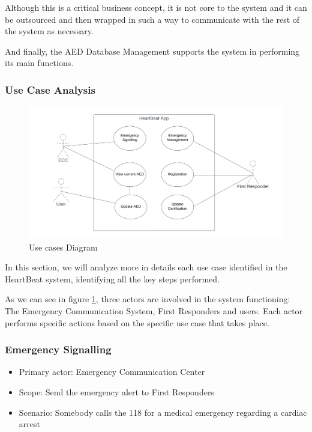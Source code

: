\documentclass[11pt,a4paper]{article}
\begin{document}
Although this is a critical business concept, it is not core to the system and it can be outsourced and then wrapped in such a way to communicate with the rest of the system as necessary.

And finally, the AED Database Management supports the system in performing its main functions.

\subsubsection{Use Case Analysis}

\begin{figure}
    \centering
    \includegraphics[scale=0.7, width=\textwidth]{images/use-case.png}
    \caption{Use cases Diagram}
    \label{fig:uml-emergency}
\end{figure}

In this section, we will analyze more in details each use case identified in the HeartBeat system, identifying all the key steps performed.

As we can see in figure \ref{fig:uml-emergency}, three actors are involved in the system functioning: 
%
The Emergency Communication System, First Responders and users.
%
Each actor performs specific actions based on the specific use case that takes place.

\subsubsection*{Emergency Signalling}

\begin{itemize}
    \item Primary actor: Emergency Communication Center
    \item Scope: Send the emergency alert to First Responders
    \item Scenario: Somebody calls the 118 for a medical emergency regarding a cardiac arrest
\end{itemize}
\end{document}
